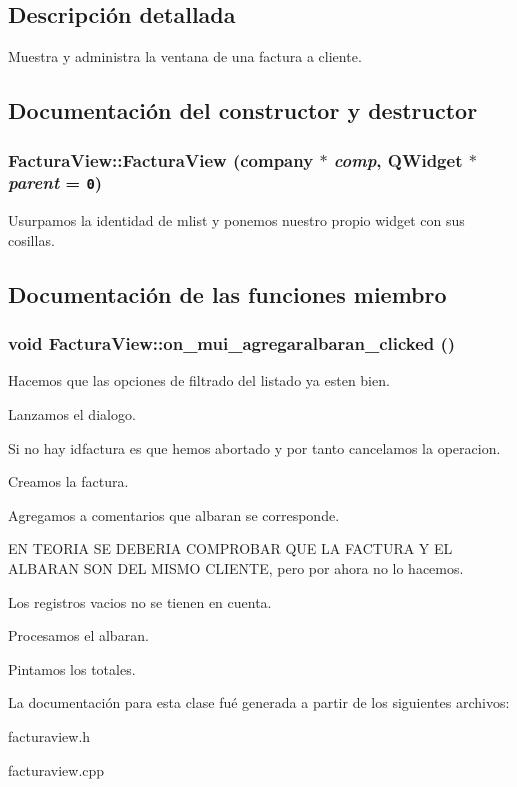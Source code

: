\subsection{Descripci\'{o}n detallada}
Muestra y administra la ventana de una factura a cliente. 



\subsection{Documentaci\'{o}n del constructor y destructor}
\subsubsection{\setlength{\rightskip}{0pt plus 5cm}Factura\-View::Factura\-View ({\bf company} $\ast$ {\em comp}, QWidget $\ast$ {\em parent} = {\tt 0})}\label{classFacturaView_a2}


Usurpamos la identidad de mlist y ponemos nuestro propio widget con sus cosillas. 

\subsection{Documentaci\'{o}n de las funciones miembro}
\subsubsection{\setlength{\rightskip}{0pt plus 5cm}void Factura\-View::on\_\-mui\_\-agregaralbaran\_\-clicked ()\hspace{0.3cm}{\tt  [virtual, slot]}}\label{classFacturaView_i1}


Hacemos que las opciones de filtrado del listado ya esten bien.

Lanzamos el dialogo.

Si no hay idfactura es que hemos abortado y por tanto cancelamos la operacion.

Creamos la factura.

Agregamos a comentarios que albaran se corresponde.

EN TEORIA SE DEBERIA COMPROBAR QUE LA FACTURA Y EL ALBARAN SON DEL MISMO CLIENTE, pero por ahora no lo hacemos.

Los registros vacios no se tienen en cuenta.

Procesamos el albaran.

Pintamos los totales. 

La documentaci\'{o}n para esta clase fu\'{e} generada a partir de los siguientes archivos:\begin{CompactItemize}
\item 
facturaview.h\item 
facturaview.cpp\end{CompactItemize}
